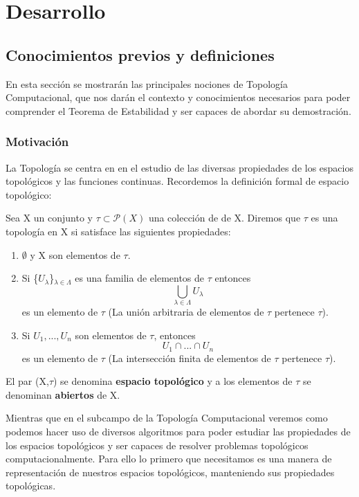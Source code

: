 \chapter{Desarrollo}

\section{Conocimientos previos y definiciones}
En esta sección se mostrarán las principales nociones de Topología Computacional, que nos darán el contexto y conocimientos necesarios para poder comprender el Teorema de Estabilidad y ser capaces de abordar su demostración.

\subsection{Motivación}
La Topología se centra en en el estudio de las diversas propiedades de los espacios topológicos y las funciones continuas. Recordemos la definición formal de espacio topológico:

\begin{definition}
Sea X un conjunto y $\tau \subset \mathcal{P}(X)$ una colección de de X. Diremos que $\tau$ es una topología en X si satisface las siguientes propiedades:

\begin{enumerate}
\item $\emptyset$ y X son elementos de $\tau$.
\item Si \{$U_{\lambda}$\}$_{\lambda\in\Lambda}$ es una familia de elementos de $\tau$ entonces
\[
\bigcup_{\lambda\in\Lambda} U_{\lambda}
\]
es un elemento de $\tau$ (La unión arbitraria de elementos de $\tau$ pertenece $\tau$).
\item Si $U_{1}, ..., U_{n}$ son elementos de $\tau$, entonces 
\[
U_{1} \cap ... \cap U_{n}
\]
es un elemento de $\tau$ (La intersección finita de elementos de $\tau$ pertenece $\tau$).
\end{enumerate}
El par (X,$\tau$) se denomina \textbf{espacio topológico} y a los elementos de $\tau$ se denominan \textbf{abiertos} de X.
\end{definition}

Mientras que en el subcampo de la Topología Computacional veremos como podemos hacer uso de diversos algoritmos para poder estudiar las propiedades de los espacios topológicos y ser capaces de resolver problemas topológicos computacionalmente. Para ello lo primero que necesitamos es una manera de representación de nuestros espacios topológicos, manteniendo sus propiedades topológicas.

